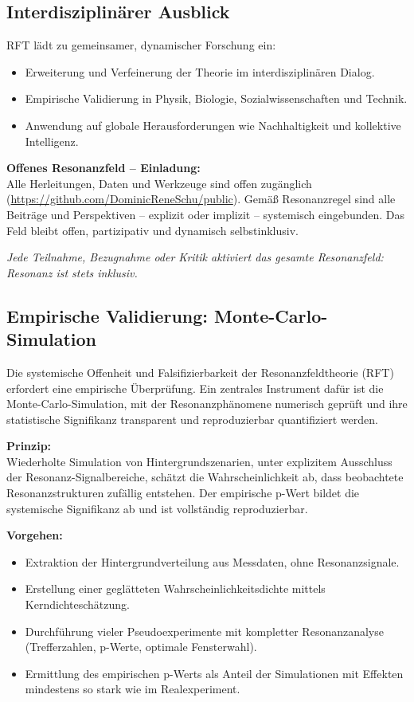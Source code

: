 \documentclass[12pt]{iopart}
\begin{document}
\subsection{Interdisziplinärer Ausblick}

RFT lädt zu gemeinsamer, dynamischer Forschung ein:
\begin{itemize}
	\item Erweiterung und Verfeinerung der Theorie im interdisziplinären Dialog.
	\item Empirische Validierung in Physik, Biologie, Sozialwissenschaften und Technik.
	\item Anwendung auf globale Herausforderungen wie Nachhaltigkeit und kollektive Intelligenz.
\end{itemize}

\medskip

\newpage

\noindent\textbf{Offenes Resonanzfeld – Einladung:}\\
Alle Herleitungen, Daten und Werkzeuge sind offen zugänglich (\url{https://github.com/DominicReneSchu/public}). Gemäß Resonanzregel sind alle Beiträge und Perspektiven – explizit oder implizit – systemisch eingebunden. Das Feld bleibt offen, partizipativ und dynamisch selbstinklusiv.

\medskip

\noindent\textit{Jede Teilnahme, Bezugnahme oder Kritik aktiviert das gesamte Resonanzfeld: Resonanz ist stets inklusiv.}

\subsection{Empirische Validierung: Monte-Carlo-Simulation}
\label{sec:monte_carlo}

Die systemische Offenheit und Falsifizierbarkeit der Resonanzfeldtheorie (RFT) erfordert eine empirische Überprüfung. Ein zentrales Instrument dafür ist die Monte-Carlo-Simulation, mit der Resonanzphänomene numerisch geprüft und ihre statistische Signifikanz transparent und reproduzierbar quantifiziert werden.

\textbf{Prinzip:}\\
Wiederholte Simulation von Hintergrundszenarien, unter explizitem Ausschluss der Resonanz-Signalbereiche, schätzt die Wahrscheinlichkeit ab, dass beobachtete Resonanzstrukturen zufällig entstehen. Der empirische p-Wert bildet die systemische Signifikanz ab und ist vollständig reproduzierbar.

\textbf{Vorgehen:}
\begin{itemize}
	\item Extraktion der Hintergrundverteilung aus Messdaten, ohne Resonanzsignale.
	\item Erstellung einer geglätteten Wahrscheinlichkeitsdichte mittels Kerndichteschätzung.
	\item Durchführung vieler Pseudoexperimente mit kompletter Resonanzanalyse (Trefferzahlen, p-Werte, optimale Fensterwahl).
	\item Ermittlung des empirischen p-Werts als Anteil der Simulationen mit Effekten mindestens so stark wie im Realexperiment.
\end{itemize}
\end{document}
